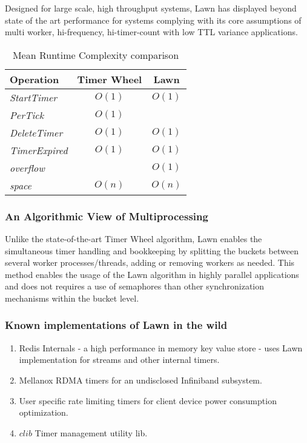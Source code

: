 \documentclass[twocolumn,a4paper]{article}
\begin{document}
Designed for large scale, high throughput systems, Lawn has displayed beyond state of the art performance for systems complying with its core assumptions of multi worker, hi-frequency, hi-timer-count with low TTL variance applications.


\begin{table}[h!]
	\begin{center}
		\begin{tabular}{l|c|c}
			\textbf{Operation} & \textbf{Timer Wheel} & \textbf{Lawn} \\
			\hline
			\textit{StartTimer} & $O(1)$ & $O(1)$ \\
			\textit{PerTick} & $O(1)$ & \boldmath{$O(t\sim1)$} \\
			\textit{DeleteTimer} & $O(1)$ & $O(1)$ \\
			\textit{TimerExpired} & $O(1)$ & $O(1)$ \\
			\textit{overflow} & \boldmath{$O(n)$} & $O(1)$ \\
			\textit{space} & $O(n)$ & $O(n)$ \\
		\end{tabular}
		\caption{Mean Runtime Complexity comparison}
		\label{tab:table1}
	\end{center}
\end{table}

\subsubsection{An Algorithmic View of Multiprocessing}
Unlike the state-of-the-art Timer Wheel algorithm, Lawn enables the simultaneous timer handling and bookkeeping by splitting the buckets between several worker processes/threads, adding or removing workers as needed. This method enables the usage of the Lawn algorithm in highly parallel applications and does not requires a use of semaphores than other synchronization mechanisms within the bucket level.


\subsubsection{Known implementations of Lawn in the wild}
\begin{enumerate}
	\item Redis Internals \cite{Redis} - a high performance in memory key value store - uses Lawn implementation for streams and other internal timers.
	\item Mellanox RDMA timers for an undisclosed Infiniband subsystem.
	\item User specific rate limiting timers for client device power consumption optimization\cite{VUSR}.
	\item $clib$ Timer management utility lib.
\end{enumerate}
\end{document}
